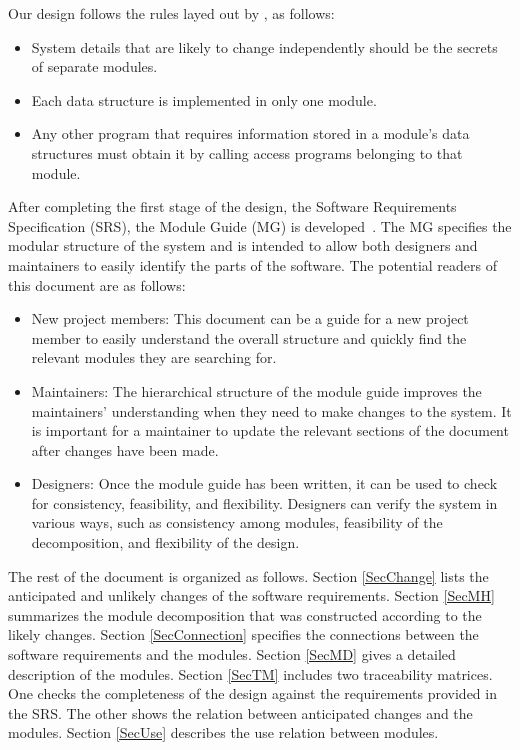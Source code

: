 \documentclass[12pt, titlepage]{article}
\begin{document}
Our design follows the rules layed out by \citet{ParnasEtAl1984}, as follows:
\begin{itemize}
  \item System details that are likely to change independently should be the
    secrets of separate modules.
  \item Each data structure is implemented in only one module.
  \item Any other program that requires information stored in a module's data
    structures must obtain it by calling access programs belonging to
    that module.
\end{itemize}

After completing the first stage of the design, the Software Requirements
Specification (SRS), the Module Guide (MG) is
developed~\citep{ParnasEtAl1984}. The MG
specifies the modular structure of the system and is intended to allow both
designers and maintainers to easily identify the parts of the software.  The
potential readers of this document are as follows:

\begin{itemize}
  \item New project members: This document can be a guide for a new
    project member
    to easily understand the overall structure and quickly find the
    relevant modules they are searching for.
  \item Maintainers: The hierarchical structure of the module guide improves the
    maintainers' understanding when they need to make changes to the
    system. It is
    important for a maintainer to update the relevant sections of the document
    after changes have been made.
  \item Designers: Once the module guide has been written, it can be used to
    check for consistency, feasibility, and flexibility. Designers
    can verify the
    system in various ways, such as consistency among modules,
    feasibility of the
    decomposition, and flexibility of the design.
\end{itemize}

The rest of the document is organized as follows. Section
\ref{SecChange} lists the anticipated and unlikely changes of the software
requirements. Section \ref{SecMH} summarizes the module decomposition that
was constructed according to the likely changes. Section \ref{SecConnection}
specifies the connections between the software requirements and the
modules. Section \ref{SecMD} gives a detailed description of the
modules. Section \ref{SecTM} includes two traceability matrices. One checks
the completeness of the design against the requirements provided in the SRS. The
other shows the relation between anticipated changes and the modules. Section
\ref{SecUse} describes the use relation between modules.
\end{document}
